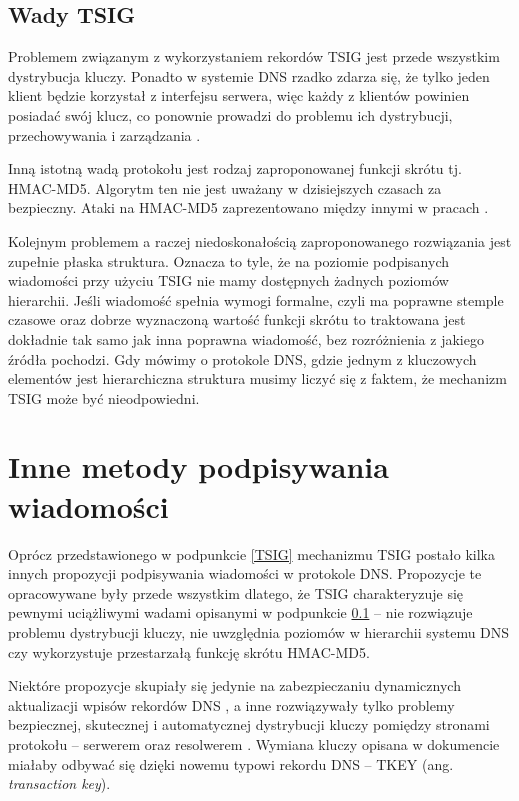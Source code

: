 \subsection{Wady TSIG}
\label{wady-tsig}
\noindent Problemem związanym z wykorzystaniem rekordów TSIG jest przede wszystkim dystrybucja kluczy. Ponadto w systemie DNS rzadko zdarza się,
że tylko jeden klient będzie korzystał z interfejsu serwera, więc każdy z klientów powinien posiadać swój klucz, co ponownie prowadzi
do problemu ich dystrybucji, przechowywania i zarządzania \cite{nask-tsig}.

Inną istotną wadą protokołu jest rodzaj zaproponowanej funkcji skrótu tj. HMAC-MD5. Algorytm ten nie jest uważany w dzisiejszych czasach
za bezpieczny. Ataki na HMAC-MD5 zaprezentowano między innymi w pracach \cite{hmac-md5-attack, hmac-md5-cryptoanalisys}.

Kolejnym problemem a raczej niedoskonałością zaproponowanego rozwiązania jest zupełnie płaska struktura. Oznacza to tyle, że na
poziomie podpisanych wiadomości przy użyciu TSIG nie mamy dostępnych żadnych poziomów hierarchii. Jeśli wiadomość spełnia wymogi
formalne, czyli ma poprawne stemple czasowe oraz dobrze wyznaczoną wartość funkcji skrótu to traktowana jest dokładnie tak samo
jak inna poprawna wiadomość, bez rozróżnienia z jakiego źródła pochodzi. Gdy mówimy o protokole DNS, gdzie jednym z kluczowych
elementów jest hierarchiczna struktura musimy liczyć się z faktem, że mechanizm TSIG może być nieodpowiedni.

\section{Inne metody podpisywania wiadomości}
\noindent Oprócz przedstawionego w podpunkcie \ref{TSIG} mechanizmu TSIG postało kilka innych propozycji podpisywania wiadomości w protokole DNS.
Propozycje te opracowywane były przede wszystkim dlatego, że TSIG charakteryzuje się pewnymi uciążliwymi wadami opisanymi w podpunkcie
\ref{wady-tsig} -- nie rozwiązuje problemu dystrybucji kluczy, nie uwzględnia poziomów w hierarchii systemu DNS czy wykorzystuje
przestarzałą funkcję skrótu HMAC-MD5.

Niektóre propozycje skupiały się jedynie na zabezpieczaniu dynamicznych aktualizacji wpisów rekordów DNS \cite{RFC2137}, a inne
rozwiązywały tylko problemy bezpiecznej, skutecznej i automatycznej dystrybucji kluczy pomiędzy stronami protokołu -- serwerem oraz
resolwerem \cite{RFC2930}. Wymiana kluczy opisana w dokumencie \cite{RFC2930} miałaby odbywać się dzięki nowemu typowi rekordu
DNS -- TKEY (ang. \textit{transaction key}).

